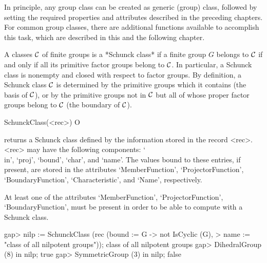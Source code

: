 
In principle, any group class can be created as generic (group) class,
followed by setting the required properties and attributes described in the
preceding chapters. For common group classes, there are additional functions
available to accomplish this task, which are described in this and the
following chapter.



A classes $\cal C$ of finite groups is a *Schunck class* if a finite group
$G$ belongs to $\cal C$ if and only if all its primitive factor groups
belong to $\cal C$. In particular, a Schunck class is nonempty and closed
with respect to factor groups. By definition, a Schunck class $\cal C$ is
determined by the primitive groups which it contains (the basis of $\cal C$),
or by the primitive groups not in $\cal C$ but all of whose proper factor
groups belong to $\cal C$ (the boundary of $\cal C$).

\>SchunckClass(<rec>) O

returns a Schunck class defined by the information stored in the record
<rec>. <rec> may have the following components: `\\in', `proj', `bound',
`char', and `name'. The values bound to these entries, if present, are
stored in the attributes `MemberFunction', `ProjectorFunction',
`BoundaryFunction', `Characteristic', and `Name', respectively.

At least one of the attributes `MemberFunction', `ProjectorFunction', 
`BoundaryFunction', must be present in order to be able to compute
with a Schunck class. 

\beginexample
gap> nilp := SchunckClass (rec (bound := G -> not IsCyclic (G),
>        name := "class of all nilpotent groups"));
class of all nilpotent groups
gap> DihedralGroup (8) in nilp;
true
gap> SymmetricGroup (3) in nilp;
false
\endexample


